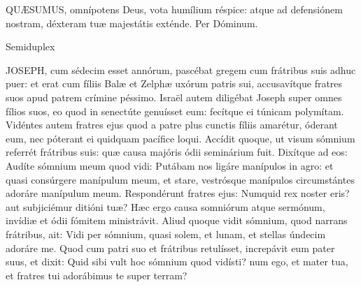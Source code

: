 \lettrine[lines=2]{Q}{UÆSUMUS}, omnípotens Deus, vota humílium réspice: atque ad defensiónem nostram, déxteram tuæ majestátis exténde. Per Dóminum.

\sectionornament



 Semiduplex





\lettrine[lines=2]{J}{OSEPH}, cum sédecim esset annórum, pascébat gregem cum frátribus suis adhuc puer: et erat cum fíliis Balæ et Zelphæ uxórum patris sui, accusavítque fratres suos apud patrem crímine péssimo. Israël autem diligébat Joseph super omnes fílios suos, eo quod in senectúte genuísset eum: fecítque ei túnicam polymítam. Vidéntes autem fratres ejus quod a patre plus cunctis fíliis amarétur, óderant eum, nec póterant ei quidquam pacífice loqui. Accídit quoque, ut visum sómnium referrét frátribus suis: quæ causa majóris ódii seminárium fuit. Dixítque ad eos: Audíte sómnium meum quod vidi: Putábam nos ligáre manípulos in agro: et quasi consúrgere manípulum meum, et stare, vestrósque manípulos circumstántes adoráre manípulum meum. Respondérunt fratres ejus: Numquid rex noster eris? aut subjiciémur ditióni tuæ? Hæc ergo causa somniórum atque sermónum, invídiæ et ódii fómitem ministrávit. Aliud quoque vidit sómnium, quod narrans frátribus, ait: Vidi per sómnium, quasi solem, et lunam, et stellas úndecim adoráre me. Quod cum patri suo et frátribus retulísset, increpávit eum pater suus, et dixit: Quid sibi vult hoc sómnium quod vidísti? num ego, et mater tua, et fratres tui adorábimus te super terram?

